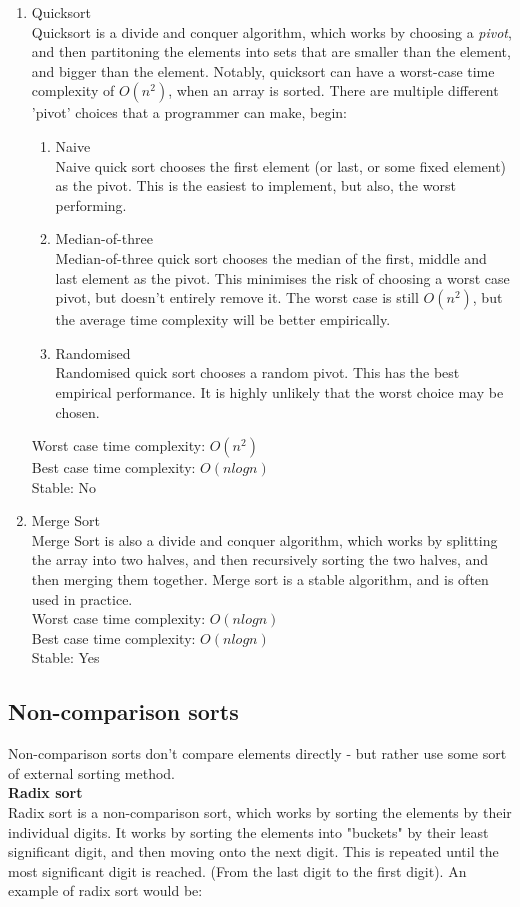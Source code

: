 \documentclass[14]{article}
\begin{document}
\begin{enumerate}
	\item Quicksort \\ 
	Quicksort is a divide and conquer algorithm, which works by choosing a \emph{pivot}, and then partitoning
	the elements into sets that are smaller than the element, and bigger than the element. Notably, quicksort 
	can have a worst-case time complexity of $O(n^2)$, when an array is sorted. There are multiple different 'pivot' choices
	that a programmer can make, begin:
	\begin{enumerate}
		\item Naive \\ 
		Naive quick sort chooses the first element (or last, or some fixed element) as the pivot. 
		This is the easiest to implement, but also, the worst performing. 
		\item Median-of-three \\ 
		Median-of-three quick sort chooses the median of the first, middle and last element as the pivot.
		This minimises the risk of choosing a worst case pivot, but doesn't entirely remove it. The worst case
		is still $O(n^2)$, but the average time complexity will be better empirically.
		\item Randomised \\ 
		Randomised quick sort chooses a random pivot. This has the best empirical performance. It is highly
		unlikely that the worst choice may be chosen.
	\end{enumerate}
	Worst case time complexity: $O(n^2)$ \\ 
	Best case time complexity: $O(nlogn)$ \\ 
	Stable: No 
\item Merge Sort \\
	Merge Sort is also a divide and conquer algorithm, which works by splitting the array into two halves, and then
	recursively sorting the two halves, and then merging them together. Merge sort is a stable algorithm, and is
	often used in practice. \\ 
	Worst case time complexity: $O(nlogn)$ \\ 
	Best case time complexity: $O(nlogn)$ \\ 
	Stable: Yes  
\end{enumerate}
\subsection{Non-comparison sorts}
Non-comparison sorts don't compare elements directly - but rather use some sort of external sorting method. \\
\textbf{Radix sort} \\ 
Radix sort is a non-comparison sort, which works by sorting the elements by their individual digits. 
It works by sorting the elements into "buckets" by their least significant digit, and then moving onto the next digit.
This is repeated until the most significant digit is reached. (From the last digit to the first digit).
An example of radix sort would be:  
\end{document}
